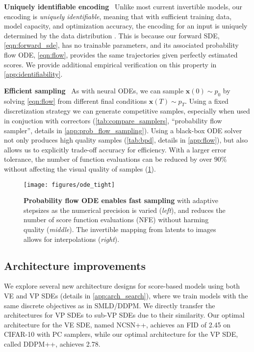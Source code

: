 \documentclass{article} \usepackage{iclr2021_conference,times}
\newcommand{\bfx}{\mathbf{x}}
\begin{document}
\textbf{Uniquely identifiable encoding}~ Unlike most current invertible models, 
our encoding is {\em uniquely identifiable}, meaning that with sufficient training data, model capacity, and optimization accuracy, the encoding for an input is uniquely determined by the data distribution \citep{roeder2020linear}. This is because our forward SDE, \cref{eqn:forward_sde}, has no trainable parameters, and its associated probability flow ODE, \cref{eqn:flow}, provides the same trajectories given perfectly estimated scores. We provide additional empirical verification on this property in \cref{app:identifiability}.

\textbf{Efficient sampling}~ As with neural ODEs, we can sample $\bfx(0) \sim p_0$ by solving \cref{eqn:flow} from different final conditions $\bfx(T)\sim p_T$. Using a fixed discretization strategy we can generate competitive samples, especially when used in conjuction with correctors (\cref{tab:compare_samplers},  ``probability flow sampler'', details in \cref{app:prob_flow_sampling}). Using a black-box ODE solver~\citep{dormand1980family} not only produces high quality samples (\cref{tab:bpd}, details in \cref{app:flow}), but also allows us to explicitly trade-off accuracy for efficiency. With a larger error tolerance, the number of function evaluations can be reduced by over $90\%$ without affecting the visual quality of samples (\cref{fig:prob_flow}).
\begin{figure}
    \centering
    \texttt{[image: figures/ode\_tight]}
    \vspace{-5mm}
    \caption{{\bf Probability flow ODE enables fast sampling} with adaptive stepsizes as the numerical precision is varied (\textit{left}), and reduces the number of score function evaluations (NFE) without harming quality (\textit{middle}). The invertible mapping from latents to images allows for interpolations (\textit{right}).}
    \label{fig:prob_flow}
\end{figure}



\subsection{Architecture improvements}\label{sec:arch}



We explore several new architecture designs for score-based models using both VE and VP SDEs (details in \cref{app:arch_search}), where we train models with the same discrete objectives as in SMLD/DDPM. We directly transfer the architectures for VP SDEs to sub-VP SDEs due to their similarity. Our optimal architecture for the VE SDE, named NCSN++, achieves an FID of 2.45 on CIFAR-10 with PC samplers, while our optimal architecture for the VP SDE, called DDPM++, achieves 2.78.
\end{document}
